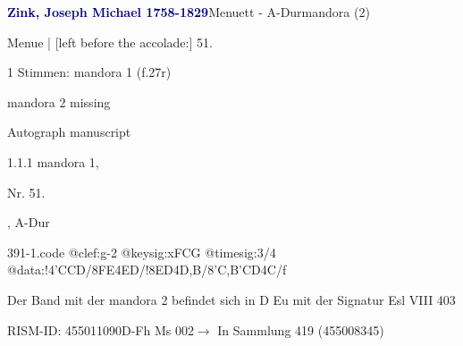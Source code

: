 \documentclass[twocolumn]{book}
\begin{document}
\par \vspace{7pt} \textcolor{darkblue}{\textbf{Zink, Joseph Michael  1758-1829}}\hfillplus{\textbf{[391]}}\newline Menuett - A-Dur\newline mandora (2)
\par \begin{itshape}[f.27r, at left:] Menue | [left before the accolade:] 51.\end{itshape} 
\par \textcolor{darkblue}{}  1 Stimmen: mandora 1  (f.27r)\newline \begin{small} mandora 2 missing\end{small} \newline Autograph manuscript
\par 1.1.1  mandora 1, \begin{itshape}Nr. 51.\end{itshape}, A-Dur  
\begin{filecontents*}{391-1.code}
@clef:g-2
@keysig:xFCG
@timesig:3/4
@data:!4'CCD/{8FE}4ED/!{8ED}4D,B/{8'C,B}{'CD}4C/f
\end{filecontents*}
\newline
%
\par Der Band mit der mandora 2 befindet sich in D Eu mit der Signatur Esl VIII 403
\par RISM-ID: 455011090\newline D-Fh  Ms 002\newline $\rightarrow$ In Sammlung 419 (455008345)
      
\end{document}
